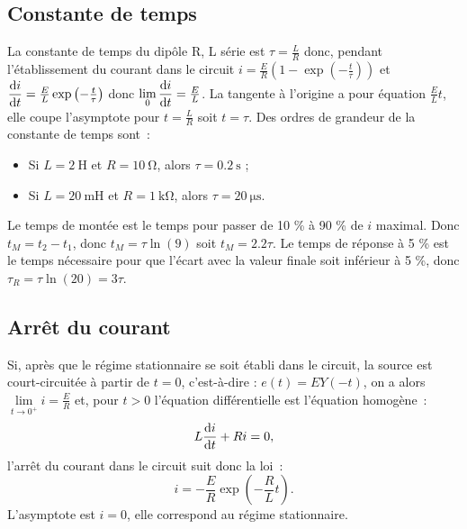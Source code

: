 \subsection{Constante de temps}%
La constante de temps du dipôle R, L série est \(\tau=\frac{L}{R}\) donc, 
pendant l'établissement du courant dans le circuit \(i = \frac{E}{R} \left(1 - 
\exp\left(-\frac{t}{\tau}\right)\right)\) et 
\(\dfrac{\mathrm{d} i}{\mathrm{d} t}=\frac{E}{L}\exp\left(-\frac{t}{\tau}\right)\) donc \( 
\lim\limits_{0} \dfrac{\mathrm{d} i}{\mathrm{d} t} = \frac{E}{L}\).
La tangente à l'origine a pour équation \(\frac{E}{L} t\), elle coupe 
l'asymptote pour \(t = \frac{L}{R}\) soit \(t = \tau\). Des ordres de grandeur 
de la constante de temps sont~:
\begin{itemize}%
  \item Si \(L=\SI{2}{\henry}\) et \(R=\SI{10}{\ohm}\), alors 
    \(\tau=\SI{0.2}{\second}\) ;
  \item Si \(L=\SI{20}{\milli\henry}\) et \(R=\SI{1}{\kilo\ohm}\), alors 
    \(\tau=\SI{20}{\micro\second}\).
\end{itemize}%
Le temps de montée est le temps pour passer de 10 \% à 90 \% de \(i\) maximal.  
Donc \(t_M = t_2 - t_1\), donc \(t_M = \tau \ln(9)\) soit \(t_M = 2.2\tau\).
Le temps de réponse à 5 \% est le temps nécessaire pour que l'écart avec la 
valeur finale soit inférieur à 5 \%, donc \(\tau_R = \tau \ln(20) = 3\tau\).
\subsection{Arrêt du courant}%
Si, après que le régime stationnaire se soit établi dans le circuit, la source 
est court-circuitée à partir de \(t = 0\), c'est-à-dire : \(e(t) = E Y(-t)\), 
on a alors \(\lim\limits_{t \to 0^+} i = \frac{E}{R}\) et, pour \(t > 0\) 
l'équation différentielle est l'équation homogène~:
\begin{equation}%
  L \derived{i}{t} + Ri = 0,
\end{equation}%
l'arrêt du courant dans le circuit suit donc la loi~:
\begin{equation}%
  i = -\frac{E}{R} \exp\left(-\frac{R}{L} t\right).
\end{equation}%
L'asymptote est \(i = 0\), elle correspond au régime stationnaire.
